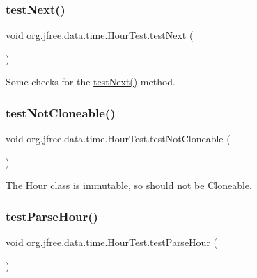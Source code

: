 \subsubsection{\texorpdfstring{test\+Next()}{testNext()}}
{\footnotesize\ttfamily void org.\+jfree.\+data.\+time.\+Hour\+Test.\+test\+Next (\begin{DoxyParamCaption}{ }\end{DoxyParamCaption})}

Some checks for the \mbox{\hyperlink{classorg_1_1jfree_1_1data_1_1time_1_1_hour_test_a1e7a5c633c5be30cf8de756571636c76}{test\+Next()}} method. \mbox{\label{classorg_1_1jfree_1_1data_1_1time_1_1_hour_test_a8656a4df17b9b64f6ebdc60a31a82ccf}} 
\subsubsection{\texorpdfstring{test\+Not\+Cloneable()}{testNotCloneable()}}
{\footnotesize\ttfamily void org.\+jfree.\+data.\+time.\+Hour\+Test.\+test\+Not\+Cloneable (\begin{DoxyParamCaption}{ }\end{DoxyParamCaption})}

The \mbox{\hyperlink{classorg_1_1jfree_1_1data_1_1time_1_1_hour}{Hour}} class is immutable, so should not be \mbox{\hyperlink{}{Cloneable}}. \mbox{\label{classorg_1_1jfree_1_1data_1_1time_1_1_hour_test_a619c90c814d46a0b90c02d6f5007cc51}} 
\subsubsection{\texorpdfstring{test\+Parse\+Hour()}{testParseHour()}}
{\footnotesize\ttfamily void org.\+jfree.\+data.\+time.\+Hour\+Test.\+test\+Parse\+Hour (\begin{DoxyParamCaption}{ }\end{DoxyParamCaption})}

